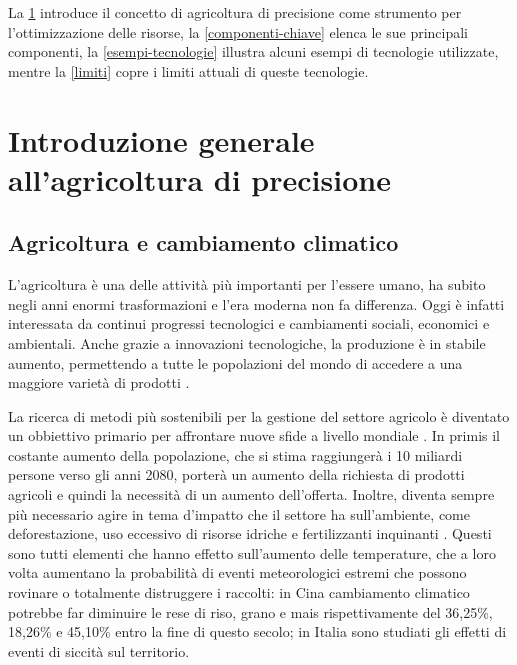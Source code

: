 \documentclass[12pt,a4paper,openright,twoside]{book}
\begin{document}
La \cref{introduzione-agricoltura-precisione} introduce il concetto di agricoltura di precisione come strumento per l'ottimizzazione delle risorse, la \cref{componenti-chiave} elenca le sue principali componenti, la \cref{esempi-tecnologie} illustra alcuni esempi di tecnologie utilizzate, mentre la \cref{limiti} copre i limiti attuali di queste tecnologie.

\section{Introduzione generale all’agricoltura di precisione}\label{introduzione-agricoltura-precisione}

\subsection{Agricoltura e cambiamento climatico}

L'agricoltura è una delle attività più importanti per l'essere umano, ha subito negli anni enormi trasformazioni e l'era moderna non fa differenza\cite{FEDERICO-FEEDING-2005}. Oggi è infatti interessata da continui progressi tecnologici e cambiamenti sociali, economici e ambientali. Anche grazie a innovazioni tecnologiche, la produzione è in stabile aumento, permettendo a tutte le popolazioni del mondo di accedere a una maggiore varietà di prodotti \cite{FAO-AGRO-STATS-2023}.

La ricerca di metodi più sostenibili per la gestione del settore agricolo è diventato un obbiettivo primario per affrontare nuove sfide a livello mondiale \cite{SDG-2-4-1}. In primis il costante aumento della popolazione, che si stima raggiungerà i 10 miliardi persone verso gli anni 2080\cite{UN-POPULATION-2024}, porterà un aumento della richiesta di prodotti agricoli e quindi la necessità di un aumento dell'offerta. Inoltre, diventa sempre più necessario agire in tema d'impatto che il settore ha sull'ambiente, come deforestazione, uso eccessivo di risorse idriche e fertilizzanti inquinanti \cite{EIOM-2012}. Questi sono tutti elementi che hanno effetto sull'aumento delle temperature, che a loro volta aumentano la probabilità di eventi meteorologici estremi che possono rovinare o totalmente distruggere i raccolti: in Cina cambiamento climatico potrebbe far diminuire le rese di riso, grano e mais rispettivamente del 36,25\%, 18,26\% e 45,10\% entro la fine di questo secolo\cite{ZHANG-PENG-2017}; in Italia sono studiati gli effetti di eventi di siccità sul territorio.
\end{document}
